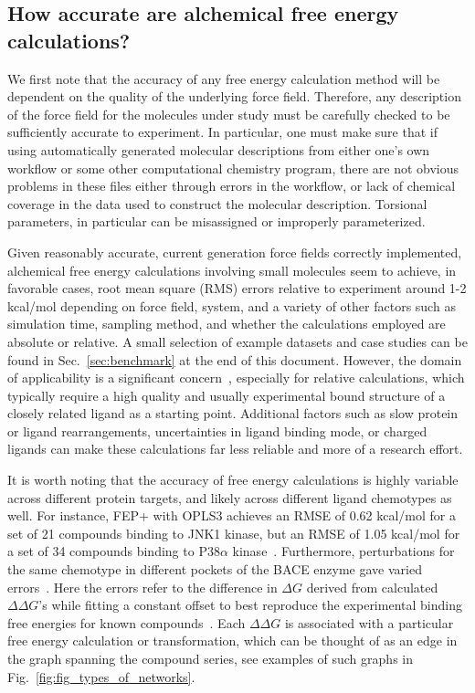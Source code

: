 \documentclass[9pt,bestpractices]{livecoms}
\begin{document}
\subsection{How accurate are alchemical free energy calculations?}
\label{subsec:expectation}
We first note that the accuracy of any free energy calculation method will be dependent on the quality of the underlying force field.  Therefore, any description of the force field for the molecules under study must be carefully checked to be sufficiently accurate to experiment. In particular, one must make sure that if using automatically generated molecular descriptions from either one's own workflow or some other computational chemistry program, there are not obvious problems in these files either through errors in the workflow, or lack of chemical coverage in the data used to construct the molecular description. Torsional parameters, in particular can be misassigned or improperly parameterized. 

Given reasonably accurate, current generation force fields correctly implemented, alchemical free energy calculations involving small molecules seem to achieve, in favorable cases, root mean square (RMS) errors relative to experiment around 1-2 kcal/mol depending on force field, system, and a variety of other factors such as simulation time, sampling method, and whether the calculations employed are absolute or relative. A small selection of example datasets and case studies can be found in Sec.~\ref{sec:benchmark} at the end of this document.
However, the domain of applicability is a significant concern~\cite{sherborne2016collaborating, cournia2017relative}, especially for relative calculations, which typically require a high quality and usually experimental bound structure of a closely
related ligand as a starting point. Additional factors such as slow protein or ligand rearrangements, uncertainties in ligand binding mode, or charged ligands can make these calculations far less reliable and more of a research effort.


It is worth noting that the accuracy of free energy calculations is highly variable across different protein targets, and likely across different ligand chemotypes as well.
For instance, FEP+ with OPLS3 achieves an RMSE of 0.62 kcal/mol for a set of 21 compounds binding to JNK1 kinase, but an RMSE of 1.05 kcal/mol for a set of 34 compounds binding to P38$\alpha$ kinase~\cite{harder2016opls3}.
Furthermore, perturbations for the same chemotype in different pockets of the BACE enzyme gave varied errors~\cite{keranen2017acylguanidine}. Here the errors refer to the difference in $\Delta G$ derived from calculated $\Delta \Delta G$'s while fitting a constant offset to best reproduce the experimental binding free energies for known compounds~\cite{wang2015accurate}. Each $\Delta \Delta G$ is associated with a particular free energy calculation or transformation, which can be thought of as an edge in the graph spanning the compound series, see examples of such graphs in Fig.~\ref{fig:fig_types_of_networks}.
\end{document}
